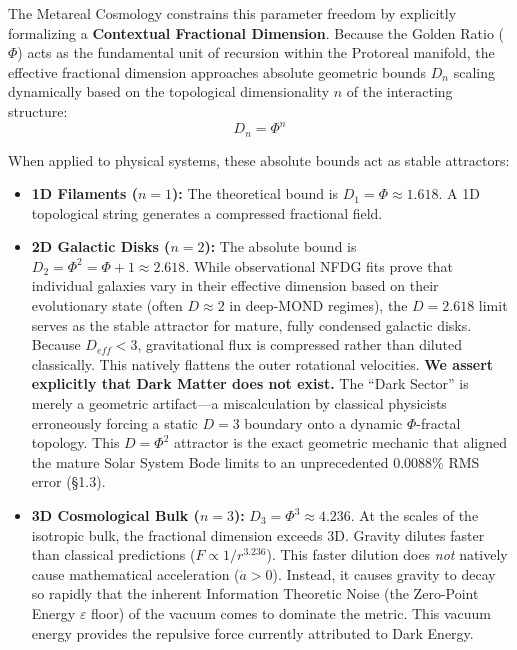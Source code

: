 The Metareal Cosmology constrains this parameter freedom by explicitly formalizing a \textbf{Contextual Fractional Dimension}. Because the Golden Ratio ($\Phi$) acts as the fundamental unit of recursion within the Protoreal manifold, the effective fractional dimension approaches absolute geometric bounds $D_n$ scaling dynamically based on the topological dimensionality $n$ of the interacting structure:
\begin{equation}
    D_n = \Phi^n
\end{equation}

When applied to physical systems, these absolute bounds act as stable attractors:
\begin{itemize}
    \item \textbf{1D Filaments ($n=1$):} The theoretical bound is $D_1 = \Phi \approx 1.618$. A 1D topological string generates a compressed fractional field.
    \item \textbf{2D Galactic Disks ($n=2$):} The absolute bound is $D_2 = \Phi^2 = \Phi + 1 \approx 2.618$. While observational NFDG fits prove that individual galaxies vary in their effective dimension based on their evolutionary state (often $D \approx 2$ in deep-MOND regimes), the $D = 2.618$ limit serves as the stable attractor for mature, fully condensed galactic disks. Because $D_{eff} < 3$, gravitational flux is compressed rather than diluted classically. This natively flattens the outer rotational velocities. \textbf{We assert explicitly that Dark Matter does not exist.} The ``Dark Sector'' is merely a geometric artifact---a miscalculation by classical physicists erroneously forcing a static $D=3$ boundary onto a dynamic $\Phi$-fractal topology. This $D = \Phi^2$ attractor is the exact geometric mechanic that aligned the mature Solar System Bode limits to an unprecedented $0.0088\%$ RMS error (\S 1.3). 
    \item \textbf{3D Cosmological Bulk ($n=3$):} $D_3 = \Phi^3 \approx 4.236$. At the scales of the isotropic bulk, the fractional dimension exceeds 3D. Gravity dilutes faster than classical predictions ($F \propto 1/r^{3.236}$). This faster dilution does \emph{not} natively cause mathematical acceleration ($\ddot{a} > 0$). Instead, it causes gravity to decay so rapidly that the inherent Information Theoretic Noise (the Zero-Point Energy $\varepsilon$ floor) of the vacuum comes to dominate the metric. This vacuum energy provides the repulsive force currently attributed to Dark Energy.
\end{itemize}

